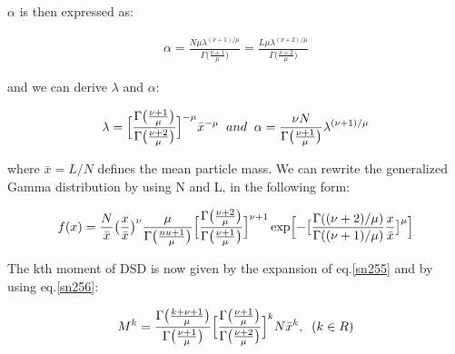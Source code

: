 $\alpha$ is then expressed as:

\begin{eqnarray}
\alpha=\frac{N\mu\lambda^{(\nu+1)/\mu}}{\Gamma\bigl(\frac{\nu+1}{\mu}\bigr)}=\frac{L\mu \lambda^{(\nu+2)/\mu}}{\Gamma\bigl(\frac{\nu+2}{\mu}\bigr)}\nonumber
\end{eqnarray}

and we can derive $\lambda$ and $\alpha$:

\begin{eqnarray}
\lambda=\Bigl[\frac{\Gamma\bigl(\frac{\nu+1}{\mu}\bigr)}{\Gamma\bigl(\frac{\nu+2}{\mu}\bigr)}\Bigr]^{-\mu}\bar{x}^{-\mu}\;\;and\;\;\alpha=\frac{\nu N}{\Gamma\bigl(\frac{\nu+1}{\mu}\bigr)}\lambda^{(\nu+1)/\mu}\label{sn256}
\end{eqnarray}

where $\bar{x}=L/N$ defines the mean particle mass. We can rewrite the generalized Gamma distribution by using N and L, in the following form:

\begin{eqnarray}
f(x)=\frac{N}{\bar{x}}\bigl(\frac{x}{\bar{x}}\bigr)^{\nu}\frac{\mu}{\Gamma\bigl(\frac{nu+1}{\mu}\bigr)}\Bigl[\frac{\Gamma\bigl(\frac{\nu+2}{\mu}\bigr)}{\Gamma\bigl(\frac{\nu+1}{\mu}\bigr)}\Bigr]^{\nu+1}\exp\Bigl[-\bigl[\frac{\Gamma((\nu+2)/\mu)}{\Gamma((\nu+1)/\mu)}\frac{x}{\bar{x}}\bigr]^{\mu}\Bigr]\label{sn257}
\end{eqnarray}

The kth moment of DSD is now given by the expansion of eq.\ref{sn255} and by using eq.\ref{sn256}:

\begin{eqnarray}
M^{k}=\frac{\Gamma\bigl(\frac{k+\nu+1}{\mu}\bigr)}{\Gamma\bigl(\frac{\nu+1}{\mu}\bigr)}\Bigl[\frac{\Gamma\bigl(\frac{\nu+1}{\mu}\bigr)}{\Gamma\bigl(\frac{\nu+2}{\mu}\bigr)}\Bigr]^{k}N\bar{x}^{k},\;\;(k\in R)
\end{eqnarray}


